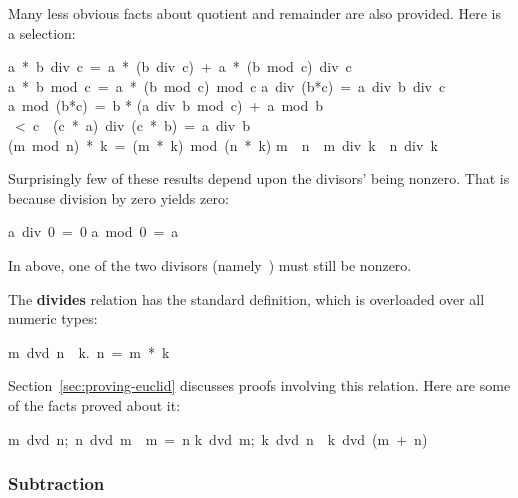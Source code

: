 Many less obvious facts about quotient and remainder are also provided.
Here is a selection:
\begin{isabelle}
a\ *\ b\ div\ c\ =\ a\ *\ (b\ div\ c)\ +\ a\ *\ (b\ mod\ c)\ div\ c%
\isanewline
a\ *\ b\ mod\ c\ =\ a\ *\ (b\ mod\ c)\ mod\ c%
\isanewline
a\ div\ (b*c)\ =\ a\ div\ b\ div\ c%
\isanewline
a\ mod\ (b*c)\ =\ b * (a\ div\ b\ mod\ c)\ +\ a\ mod\ b%
\ <\ c\ \isasymLongrightarrow \ (c\ *\ a)\ div\ (c\ *\ b)\ =\ a\ div\ b%
\isanewline
(m\ mod\ n)\ *\ k\ =\ (m\ *\ k)\ mod\ (n\ *\ k)
\isanewline
m\ \isasymle \ n\ \isasymLongrightarrow \ m\ div\ k\ \isasymle \ n\ div\ k%
\end{isabelle}

Surprisingly few of these results depend upon the
divisors' being nonzero.
%
That is because division by
zero yields zero:
\begin{isabelle}
a\ div\ 0\ =\ 0
\isanewline
a\ mod\ 0\ =\ a%
\end{isabelle}
In  above, one of
the two divisors (namely~) must still be nonzero.

The \textbf{divides} relation
has the standard definition, which
is overloaded over all numeric types:
\begin{isabelle}
m\ dvd\ n\ \isasymequiv\ {\isasymexists}k.\ n\ =\ m\ *\ k
\end{isabelle}
%
Section~\ref{sec:proving-euclid} discusses proofs involving this
relation.  Here are some of the facts proved about it:
\begin{isabelle}
\isasymlbrakk m\ dvd\ n;\ n\ dvd\ m\isasymrbrakk \ \isasymLongrightarrow \ m\ =\ n%
\isanewline
\isasymlbrakk k\ dvd\ m;\ k\ dvd\ n\isasymrbrakk \ \isasymLongrightarrow \ k\ dvd\ (m\ +\ n)
\end{isabelle}

\subsubsection{Subtraction}


